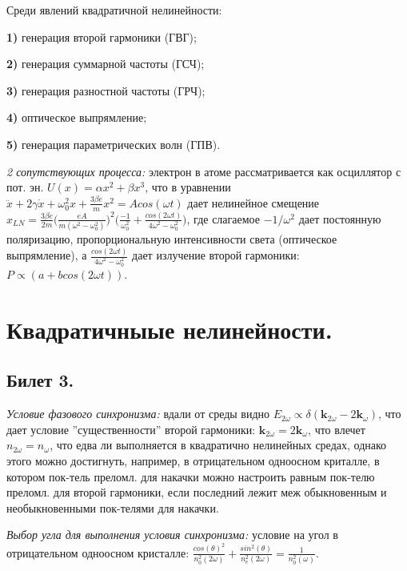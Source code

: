 \documentclass[a4paper,12pt]{article}
\theoremstyle{definition} %
\theoremstyle{definition} %
\theoremstyle{remark} %
\begin{document}
Среди явлений квадратичной нелинейности: \\
	\par \textbf{1)} генерация второй гармоники (ГВГ); \\
	\par \textbf{2)} генерация суммарной частоты (ГСЧ); \\
	\par \textbf{3)} генерация разностной частоты (ГРЧ); \\
	\par \textbf{4)} оптическое выпрямление; \\
	\par \textbf{5)} генерация параметрических волн (ГПВ).


\textit{2 сопутствующих процесса:} электрон в атоме рассматривается как осциллятор с пот. эн. $U(x)=\alpha x^{2} + \beta x^{3}$, что в уравнении $\ddot{x} + 2\gamma \dot{x} + \omega_{0}^{2} x + \frac{3\beta e}{m} x^{2} = Acos(\omega t)$ дает нелинейное смещение $x_{LN} = \frac{3\beta e}{2m} \Big( \frac{eA}{m(\omega^{2}-\omega_{0}^{2})} \Big)^{2} \Big( \frac{-1}{\omega_{0}^{2}} + \frac{cos(2\omega t)}{4\omega^{2}-\omega_{0}^{2}} \Big)$, где слагаемое $-1/\omega^{2}$ дает постоянную поляризацию, пропорциональную интенсивности света (оптическое выпрямление), а $\frac{cos(2\omega t)}{4\omega^{2}-\omega_{0}^{2}}$ дает излучение второй гармоники: \\ $P \propto (a+bcos(2\omega t))$.


\section{Квадратичныые нелинейности.}
\subsection{Билет 3.}


\textit{Условие фазового синхронизма:} вдали от среды видно $E_{2\omega} \propto \delta(\mathbf{k}_{2\omega}-2\mathbf{k}_{\omega})$, что дает условие ''существенности'' второй гармоники: $\mathbf{k}_{2\omega}=2\mathbf{k}_{\omega}$, что влечет $n_{2\omega}=n_{\omega}$, что едва ли выполняется в квадратично нелинейных средах, однако этого можно достигнуть, например, в отрицательном одноосном криталле, в котором пок-тель преломл. для накачки можно настроить равным пок-телю преломл. для второй гармоники, если последний лежит меж обыкновенным и необыкновенными пок-телями для накачки.


\textit{Выбор угла для выполнения условия синхронизма:} условие на угол в отрицательном одноосном кристалле: $\frac{cos(\theta)^{2}}{n_{0}^{2}(2\omega)} + \frac{sin^{2}(\theta)}{n_{e}^{2}(2\omega)} = \frac{1}{n_{0}^{2}(\omega)}$.
\end{document}
